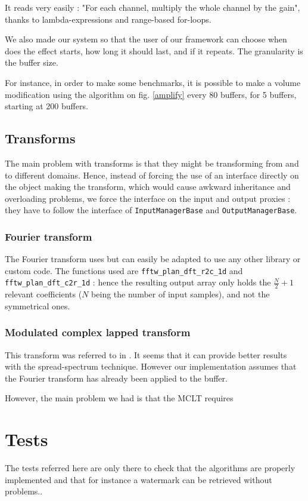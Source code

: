 It reads very easily : "For each channel, multiply the whole channel by the gain", thanks to lambda-expressions and range-based for-loops.

We also made our system so that the user of our framework can choose when does the effect starts, how long it should last, and if it repeats. The granularity is the buffer size.

For instance, in order to make some benchmarks, it is possible to make a volume modification using the algorithm on fig. \ref{amplify} every 80 buffers, for 5 buffers, starting at 200 buffers.
\subsection{Transforms}
The main problem with transforms is that they might be transforming from and to different domains.
Hence, instead of forcing the use of an interface directly on the object making the transform, which would cause awkward inheritance and overloading problems, we force the interface on the input and output proxies : they have to follow the interface of \texttt{InputManagerBase} and \texttt{OutputManagerBase}.

\subsubsection{Fourier transform}
The Fourier transform uses  but can easily be adapted to use any other library or custom code.
The functions used are \texttt{fftw\_plan\_dft\_r2c\_1d} and \texttt{fftw\_plan\_dft\_c2r\_1d} : hence the resulting output array 
only holds the $\frac{N}{2} + 1$ relevant coefficients ($N$ being the number of input samples), and not the symmetrical ones.

\subsubsection{Modulated complex lapped transform}
This transform was referred to in \cite{malvar1999modulated}. It seems that it can provide better results with the spread-spectrum technique. However our implementation assumes that the Fourier transform has already been applied to the buffer.

However, the main problem we had is that the MCLT requires 

\section{Tests}
The tests referred here are only there to check that the algorithms are properly implemented and that for instance a watermark can be retrieved without problems..

